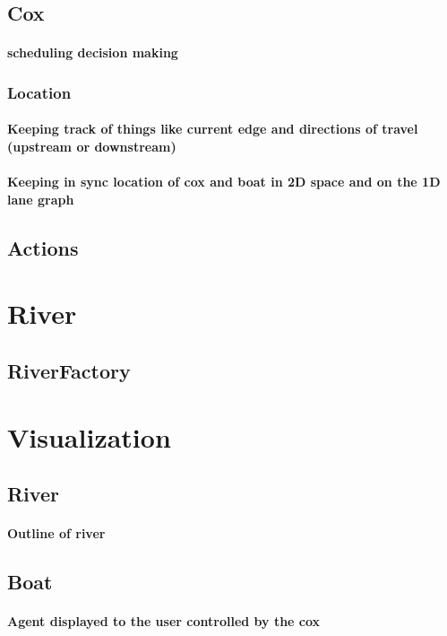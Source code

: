   \subsection{Cox}
    \paragraph{scheduling decision making}
    \subsubsection{Location}
      \paragraph{Keeping track of things like current edge and directions of travel (upstream or downstream)}
      \paragraph{Keeping in sync location of cox and boat in 2D space and on the 1D lane graph}
    
  \subsection{Actions}
  
\section{River}
  \subsection{RiverFactory}

\section{Visualization}
  \subsection{River}
    \paragraph{Outline of river}
  
  \subsection{Boat}
    \paragraph{Agent displayed to the user controlled by the cox}
